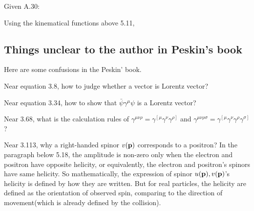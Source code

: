 Given A.30:



Using the kinematical functions above 5.11,


\subsection{Things unclear to the author in Peskin's book}

Here are some confusions in the Peskin' book. 

Near equation 3.8, how to judge whether a vector is Lorentz vector? 

Near equation 3.34, how to show that $\bar{\psi}\gamma^\mu\psi$ is a Lorentz vector? 

Near 3.68, what is the calculation rules of $\gamma^{\mu\nu\rho}=\gamma^{\left[\mu\right.}\gamma^\nu\gamma^{\left.\rho\right]}$ and $\gamma^{\mu\nu\rho\sigma}=\gamma^{\left[\mu\right.}\gamma^\nu\gamma^\rho\gamma^{\left.\sigma\right]}$?

Near 3.113, why a right-handed spinor $v(\bf{p})$ corresponds to a positron?
In the paragraph below 5.18, the amplitude is non-zero only when the electron and positron have opposite helicity,
or equivalently, the electron and positron's spinors have same helicity.
So mathematically, the expression of spinor $u(\bf{p}),v(\bf{p})$'s helicity is defined by how they are written.
But for real particles, the helicity are defined as the orientation of observed spin, comparing to the direction of movement(which is already defined by the collision).
